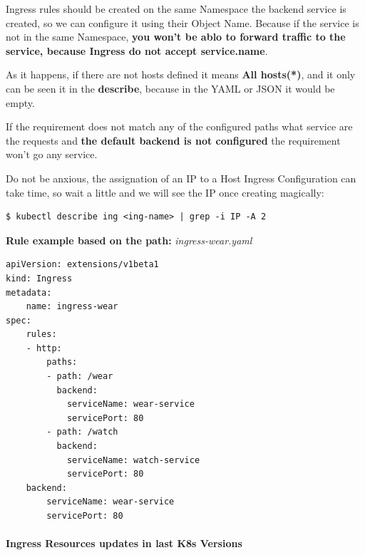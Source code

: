 \documentclass{article}
\newenvironment{blocktemplateII}[1]{%
    \tcolorbox[beamer,%
    noparskip,breakable,
    colframe=Green,%
    colbacklower=LimeGreen!75!LightGreen,%
    title=#1]}%
    {\endtcolorbox}
\newenvironment{blocktemplateIII}[1]{%
    \tcolorbox[beamer,%
    noparskip,breakable,
    ,colframe=Red,%
    colbacklower=LimeGreen!75!LightGreen,%
    title=#1]}%
    {\endtcolorbox}
\newenvironment{codetemplate}[1][]{%
  \mybasecolorbox[#1]
  \itshape
}{%
  \endmybasecolorbox
}
\begin{document}
\begin{blocktemplateIII}{WARNING}
Ingress rules should be created on the same Namespace the backend service is created, so we can configure it using their Object Name. 
Because if the service is not in the same Namespace, \textbf{you won't be ablo to forward traffic to the service, 
because Ingress do not accept service.name}.
\end{blocktemplateIII}

\begin{blocktemplateIII}{WARNING}
As it happens, if there are not hosts defined it means \textbf{All hosts(*)}, and it only can be seen it in the \textbf{describe}, because in the YAML or JSON it would be empty.
\end{blocktemplateIII}

\begin{blocktemplateIII}{WARNING}
If the requirement does not match any of the configured paths what service are the requests and \textbf{the default backend is not configured} the requirement won't go any service.
\end{blocktemplateIII}

\begin{blocktemplateII}{NOTE}
Do not be anxious, the assignation of an IP to a Host Ingress Configuration can take time, so wait a little and we will see the IP once creating magically:
\begin{codetemplate}{}
\begin{verbatim}
$ kubectl describe ing <ing-name> | grep -i IP -A 2
\end{verbatim}
\end{codetemplate}
\end{blocktemplateII}

\textbf{Rule example based on the path:}
\begin{codetemplate}{ingress-wear.yaml}
\begin{verbatim}
apiVersion: extensions/v1beta1
kind: Ingress
metadata:
    name: ingress-wear
spec:
    rules:
    - http:
        paths:
        - path: /wear
          backend:
            serviceName: wear-service
            servicePort: 80
        - path: /watch
          backend:
            serviceName: watch-service
            servicePort: 80 
    backend:
        serviceName: wear-service
        servicePort: 80
\end{verbatim}
\end{codetemplate}

\paragraph{Ingress Resources updates in last K8s Versions}
\end{document}
